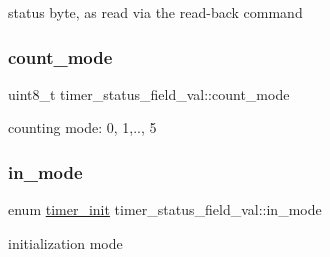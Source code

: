 status byte, as read via the read-\/back command \mbox{\label{group__timer_ga069cd58184fd977a3345d560f159037a}} 
\subsubsection{\texorpdfstring{count\_mode}{count\_mode}}
{\footnotesize\ttfamily uint8\+\_\+t timer\+\_\+status\+\_\+field\+\_\+val\+::count\+\_\+mode}

counting mode\+: 0, 1,.., 5 \mbox{\label{group__timer_ga16c0028c537ce578196381bdc0cd97fd}} 
\subsubsection{\texorpdfstring{in\_mode}{in\_mode}}
{\footnotesize\ttfamily enum \mbox{\hyperlink{group__timer_ga5cc20f14fd50625eea9b20f58fbe2a55}{timer\+\_\+init}} timer\+\_\+status\+\_\+field\+\_\+val\+::in\+\_\+mode}

initialization mode 